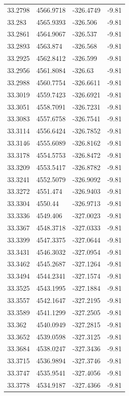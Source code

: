 \begin{table}[H]
\begin{tabular}{llll}
33.2798 & 4566.9718 & -326.4749 & -9.81 \\
33.283 & 4565.9393 & -326.506 & -9.81 \\
33.2861 & 4564.9067 & -326.537 & -9.81 \\
33.2893 & 4563.874 & -326.568 & -9.81 \\
33.2925 & 4562.8412 & -326.599 & -9.81 \\
33.2956 & 4561.8084 & -326.63 & -9.81 \\
33.2988 & 4560.7754 & -326.6611 & -9.81 \\
33.3019 & 4559.7423 & -326.6921 & -9.81 \\
33.3051 & 4558.7091 & -326.7231 & -9.81 \\
33.3083 & 4557.6758 & -326.7541 & -9.81 \\
33.3114 & 4556.6424 & -326.7852 & -9.81 \\
33.3146 & 4555.6089 & -326.8162 & -9.81 \\
33.3178 & 4554.5753 & -326.8472 & -9.81 \\
33.3209 & 4553.5417 & -326.8782 & -9.81 \\
33.3241 & 4552.5079 & -326.9092 & -9.81 \\
33.3272 & 4551.474 & -326.9403 & -9.81 \\
33.3304 & 4550.44 & -326.9713 & -9.81 \\
33.3336 & 4549.406 & -327.0023 & -9.81 \\
33.3367 & 4548.3718 & -327.0333 & -9.81 \\
33.3399 & 4547.3375 & -327.0644 & -9.81 \\
33.3431 & 4546.3032 & -327.0954 & -9.81 \\
33.3462 & 4545.2687 & -327.1264 & -9.81 \\
33.3494 & 4544.2341 & -327.1574 & -9.81 \\
33.3525 & 4543.1995 & -327.1884 & -9.81 \\
33.3557 & 4542.1647 & -327.2195 & -9.81 \\
33.3589 & 4541.1299 & -327.2505 & -9.81 \\
33.362 & 4540.0949 & -327.2815 & -9.81 \\
33.3652 & 4539.0598 & -327.3125 & -9.81 \\
33.3684 & 4538.0247 & -327.3436 & -9.81 \\
33.3715 & 4536.9894 & -327.3746 & -9.81 \\
33.3747 & 4535.9541 & -327.4056 & -9.81 \\
33.3778 & 4534.9187 & -327.4366 & -9.81 \\

\end{tabular}
\end{table}
